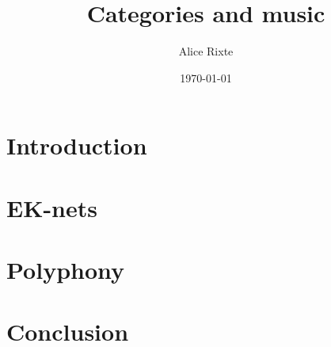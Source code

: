 \documentclass{report}
\begin{document}

\title{Categories and music}
\author{Alice Rixte}
\date{\today}
\maketitle %


\tableofcontents




\chapter{Introduction}




\chapter{EK-nets}


\chapter{Polyphony}




\chapter{Conclusion}


\printnomenclature[2cm]

\newpage


\end{document}
